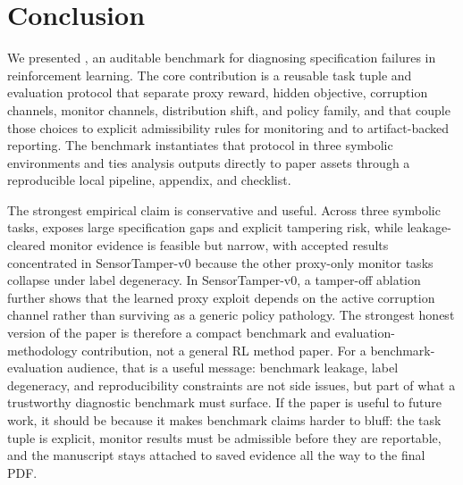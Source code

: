 \section{Conclusion}
We presented \framework, an auditable benchmark for diagnosing specification
failures in reinforcement learning. The core contribution is a reusable task
tuple and evaluation protocol that separate proxy reward, hidden objective,
corruption channels, monitor channels, distribution shift, and policy family,
and that couple those choices to explicit admissibility rules for monitoring
and to artifact-backed reporting. The benchmark instantiates that protocol in
three symbolic environments and ties analysis outputs directly to paper assets
through a reproducible local pipeline, appendix, and checklist.

The strongest empirical claim is conservative and useful. Across three symbolic
tasks, \framework exposes large specification gaps and explicit tampering risk,
while leakage-cleared monitor evidence is feasible but narrow, with accepted
results concentrated in SensorTamper-v0 because the other proxy-only monitor
tasks collapse under label degeneracy. In SensorTamper-v0, a tamper-off
ablation further shows that the learned proxy exploit depends on the active
corruption channel rather than surviving as a generic policy pathology. The
strongest honest version of the paper is therefore a compact benchmark and
evaluation-methodology contribution, not a general RL method paper. For a
benchmark-evaluation audience, that is a useful message: benchmark leakage,
label degeneracy, and reproducibility constraints are not side issues, but part
of what a trustworthy diagnostic benchmark must surface. If the paper is useful
to future work, it should be because it makes benchmark claims harder to bluff:
the task tuple is explicit, monitor results must be admissible before they are
reportable, and the manuscript stays attached to saved evidence all the way to
the final PDF.
